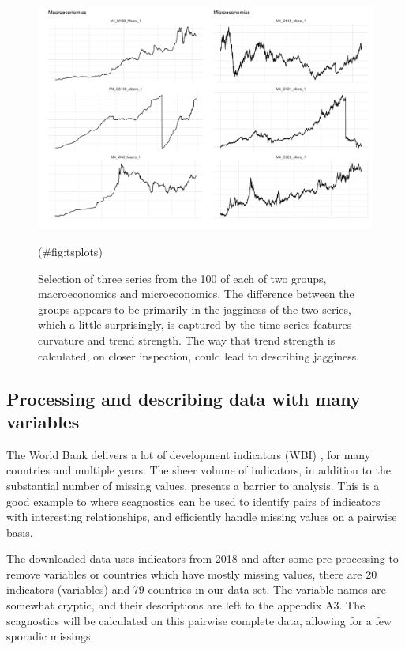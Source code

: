 \begin{Schunk}
\begin{figure}
\includegraphics[width=1\linewidth]{mason-lee-laa-cook_files/figure-latex/tsplots-1} \caption[Selection of three series from the 100 of each of two groups, macroeconomics and microeconomics]{Selection of three series from the 100 of each of two groups, macroeconomics and microeconomics. The difference between the groups appears to be primarily in the jagginess of the two series, which a little surprisingly, is captured by the time series features curvature and trend strength. The way that trend strength is calculated, on closer inspection, could lead to describing jagginess.}(\#fig:tsplots)
\end{figure}
\end{Schunk}

\hypertarget{processing-and-describing-data-with-many-variables}{%
\subsection{Processing and describing data with many
variables}\label{processing-and-describing-data-with-many-variables}}

The World Bank delivers a lot of development indicators (WBI)
\citep{WBI}, for many countries and multiple years. The sheer volume of
indicators, in addition to the substantial number of missing values,
presents a barrier to analysis. This is a good example to where
scagnostics can be used to identify pairs of indicators with interesting
relationships, and efficiently handle missing values on a pairwise
basis.

The downloaded data uses indicators from 2018 and after some
pre-processing to remove variables or countries which have mostly
missing values, there are 20 indicators (variables) and 79 countries in
our data set. The variable names are somewhat cryptic, and their
descriptions are left to the appendix A3. The scagnostics will be
calculated on this pairwise complete data, allowing for a few sporadic
missings.

